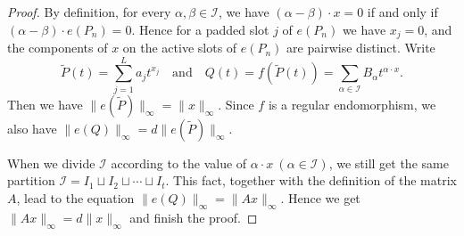 \documentclass[10pt,a4paper]{amsart}
\begin{document}
\begin{proof}
By definition, for every $\alpha,\beta\in\mathcal{I}$, we have $(\alpha-\beta)\cdot x=0$ if and only if $(\alpha-\beta)\cdot e(P_n)=0$. Hence for a padded slot $j$ of $e(P_n)$ we have $x_j=0$, and the components of $x$ on the active slots of $e(P_n)$ are pairwise distinct. Write
$$
\tilde{P}(t)=\sum\limits_{j=1}^L a_jt^{x_j}\quad\text{and}\quad Q(t)=f(\tilde{P}(t))=\sum\limits_{\alpha\in\mathcal{I}}B_{\alpha}t^{\alpha\cdot x}.
$$
Then we have $\|e(\tilde{P})\|_{\infty}=\|x\|_{\infty}$. Since $f$ is a regular endomorphism, we also have $\|e(Q)\|_{\infty}=d\|e(\tilde{P})\|_{\infty}$.

When we divide $\mathcal{I}$ according to the value of $\alpha\cdot x\ (\alpha\in\mathcal{I})$, we still get the same partition $\mathcal{I}=I_1\sqcup I_2\sqcup\cdots\sqcup I_t$. This fact, together with the definition of the matrix $A$, lead to the equation $\|e(Q)\|_{\infty}=\|Ax\|_{\infty}$. Hence we get $\|Ax\|_{\infty}=d\|x\|_{\infty}$ and finish the proof.
\end{proof}
\end{document}
